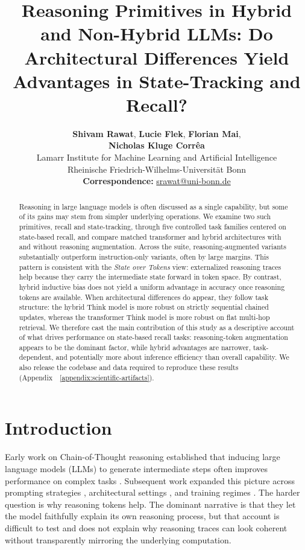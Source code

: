 \documentclass[11pt]{article}
\title{Reasoning Primitives in Hybrid and Non-Hybrid LLMs: Do Architectural Differences Yield Advantages in State-Tracking and Recall?}
\author{
  \textbf{Shivam Rawat},
  \textbf{Lucie Flek},
  \textbf{Florian Mai},
\\
  \textbf{Nicholas Kluge Corr\^ea}
\\
  Lamarr Institute for Machine Learning and Artificial Intelligence \\
  Rheinische Friedrich-Wilhelms-Universit\"at Bonn \\
  \small \textbf{Correspondence:} \href{mailto:srawat@uni-bonn.de}{srawat@uni-bonn.de}
}
\theoremstyle{definition}
\begin{document}
\maketitle

\begin{abstract}
Reasoning in large language models is often discussed as a single capability, but some of its gains may stem from simpler underlying operations. We examine two such primitives, recall and state-tracking, through five controlled task families centered on state-based recall, and compare matched transformer and hybrid architectures with and without reasoning augmentation. Across the suite, reasoning-augmented variants substantially outperform instruction-only variants, often by large margins. This pattern is consistent with the \textit{State over Tokens} view: externalized reasoning traces help because they carry the intermediate state forward in token space. By contrast, hybrid inductive bias does not yield a uniform advantage in accuracy once reasoning tokens are available. When architectural differences do appear, they follow task structure: the hybrid Think model is more robust on strictly sequential chained updates, whereas the transformer Think model is more robust on flat multi-hop retrieval. We therefore cast the main contribution of this study as a descriptive account of what drives performance on state-based recall tasks: reasoning-token augmentation appears to be the dominant factor, while hybrid advantages are narrower, task-dependent, and potentially more about inference efficiency than overall capability. We also release the codebase and data required to reproduce these results (Appendix~~\ref{appendix:scientific-artifacts}).
\end{abstract}

\section{Introduction}
\label{sec:intro}

Early work on Chain-of-Thought reasoning established that inducing large language models (LLMs) to generate intermediate steps often improves performance on complex tasks \cite{wei2022chain}. Subsequent work expanded this picture across prompting strategies \cite{yao2023tree}, architectural settings \cite{geiping2025scaling}, and training regimes \cite{wang2025thinking,yang2025qwen3,bakouch2025smollm3,zeng2026glm}. The harder question is why reasoning tokens help. The dominant narrative is that they let the model faithfully explain its own reasoning process, but that account is difficult to test and does not explain why reasoning traces can look coherent without transparently mirroring the underlying computation.
\end{document}
